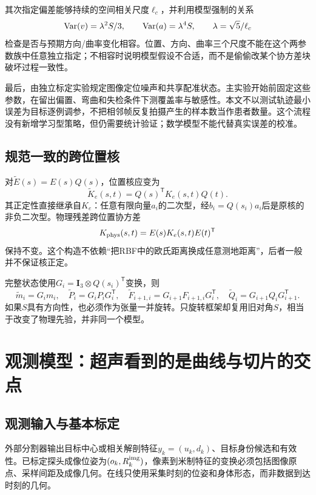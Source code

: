 \documentclass[UTF8,11pt,a4paper,fontset=fandol]{ctexart}
\numberwithin{equation}{section}
\theoremstyle{plain}
\theoremstyle{definition}
\theoremstyle{remark}
\newcommand{\Id}{\mathbf I}\newcommand{\T}{^{\mathsf T}}
\begin{document}
其次指定偏差能够持续的空间相关尺度$\ell_c$，并利用模型强制的关系
\begin{equation}
 \operatorname{Var}(v)=\lambda^2S/3,\qquad \operatorname{Var}(a)=\lambda^4S,
 \qquad \lambda=\sqrt5/\ell_c
 \label{eq:prior-derivative-scales}
\end{equation}
检查是否与预期方向/曲率变化相容。位置、方向、曲率三个尺度不能在这个两参数族中任意独立指定；不相容时说明模型假设不合适，而不是偷偷改某个协方差块破坏过程一致性。

最后，由独立标定实验规定图像定位噪声和共享配准状态。主实验开始前固定这些参数，在留出偏置、弯曲和失检条件下测覆盖率与敏感性。本文不以测试轨迹最小误差为目标逐例调参，不把相邻帧反复拍摄产生的样本数当作患者数量。这个流程没有新增学习型策略，但仍需要统计验证；数学模型不能代替真实误差的校准。

\subsection{规范一致的跨位置核}
对$\widetilde E(s)=E(s)Q(s)$，位置核应变为
\begin{equation}
 \boxed{\widetilde K_e(s,t)=Q(s)\T K_e(s,t)Q(t).}
 \label{eq:kernel-gauge}
\end{equation}
其正定性直接继承自$K_e$：任意有限向量$a_i$的二次型，经$b_i=Q(s_i)a_i$后是原核的非负二次型。物理残差跨位置协方差
\begin{equation}
 K_{\rm phys}(s,t)=E(s)K_e(s,t)E(t)\T
 \label{eq:physical-cross-cov}
\end{equation}
保持不变。这个构造不依赖“把RBF中的欧氏距离换成任意测地距离”，后者一般并不保证核正定\cite{Hutchinson2021}。

完整状态使用$G_i=\Id_3\otimes Q(s_i)\T$变换，则
\begin{equation}
 \widetilde m_i=G_i m_i,\quad \widetilde P_i=G_iP_iG_i\T,\quad
 \widetilde F_{i+1,i}=G_{i+1}F_{i+1,i}G_i\T,\quad
 \widetilde Q_i=G_{i+1}Q_iG_{i+1}\T.
 \label{eq:state-gauge}
\end{equation}
如果$S$具有方向性，也必须作为张量一并旋转。只旋转框架却复用旧对角$S$，相当于改变了物理先验，并非同一个模型。

\section{观测模型：超声看到的是曲线与切片的交点}\label{sec:observation}
\subsection{观测输入与基本标定}
外部分割器输出目标中心或相关解剖特征$y_k=(u_k,d_k)$、目标身份候选和有效性。已标定探头成像位姿为$(o_k,R_k^{\rm img})$，像素到米制特征的变换必须包括图像原点、采样间距及成像几何。在线只使用采集时刻的位姿和身体形态，而非数据到达时刻的几何。
\end{document}
